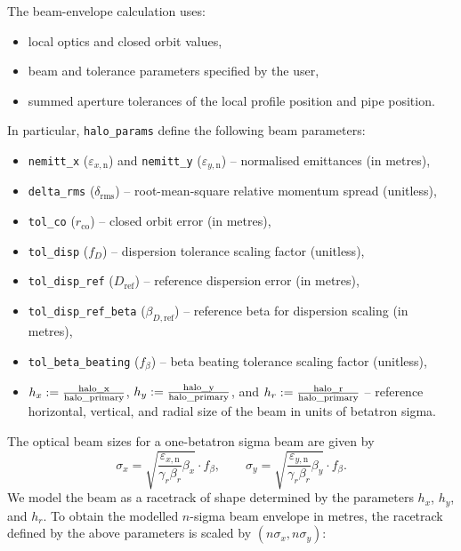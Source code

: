 The beam-envelope calculation uses:
\begin{itemize}
    \item local optics and closed orbit values,
    \item beam and tolerance parameters specified by the user,
    \item summed aperture tolerances of the local profile position and pipe position.
\end{itemize}
In particular, \lstinline{halo_params} define the following beam parameters:
\begin{itemize}
    \item \lstinline{nemitt_x} ($\varepsilon_{x,\mathrm{n}}$) and
    \lstinline{nemitt_y} ($\varepsilon_{y,\mathrm{n}}$) -- normalised emittances (in metres),
    \item \lstinline{delta_rms} ($\delta_\mathrm{rms}$) -- root-mean-square relative momentum spread (unitless),
    \item \lstinline{tol_co} ($r_\mathrm{co}$) -- closed orbit error (in metres),
    \item \lstinline{tol_disp} ($f_D$) -- dispersion tolerance scaling factor (unitless),
    \item \lstinline{tol_disp_ref} ($D_\mathrm{ref}$) -- reference dispersion error (in metres),
    \item \lstinline{tol_disp_ref_beta} ($\beta_{D,\mathrm{ref}}$) -- reference beta for dispersion scaling (in metres),
    \item \lstinline{tol_beta_beating} ($f_\beta$) -- beta beating tolerance scaling factor (unitless),
    \item $h_x := \frac{\text{\lstinline{halo_x}}}{\text{\lstinline{halo_primary}}}$, $h_y := \frac{\text{\lstinline{halo_y}}}{\text{\lstinline{halo_primary}}}$, and $h_r := \frac{\text{\lstinline{halo_r}}}{\text{\lstinline{halo_primary}}}$ -- reference horizontal, vertical, and radial size of the beam in units of betatron sigma.
\end{itemize}
The optical beam sizes for a one-betatron sigma beam are given by
\[
\sigma_x = \sqrt{\frac{\varepsilon_{x,\mathrm{n}}}{\gamma_r\beta_r}\beta_x} \cdot f_\beta,
\qquad
\sigma_y = \sqrt{\frac{\varepsilon_{y,\mathrm{n}}}{\gamma_r\beta_r}\beta_y} \cdot f_\beta.
\]
We model the beam as a racetrack of shape determined by the parameters $h_x$, $h_y$, and $h_r$.
To obtain the modelled $n$-sigma beam envelope in metres, the racetrack defined by the above parameters is scaled by $(n\sigma_x, n\sigma_y)$:
